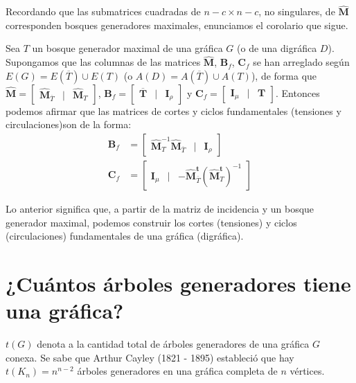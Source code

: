 Recordando que las submatrices cuadradas de $n-c \times n-c$, no singulares, de $\mathbf{\widehat{M}}$ corresponden bosques generadores maximales, enunciamos el corolario que sigue.

\begin{cor}
Sea $T$ un bosque generador maximal de una gráfica $G$ (o de una digráfica $D$). Supongamos que las columnas de las matrices  $\mathbf{\widehat{M}}$, $\mathbf{B}_{f}$, $\mathbf{C}_{f}$ se han arreglado según $E(G) = E(\overline{T}) \cup E(T)$ (o $A(D) = A(\overline{T}) \cup A(T)$), de forma que $\mathbf{\widehat{M}} = \begin{bmatrix} \mathbf{\widehat{M}}_{\overline{T}} & |& \mathbf{\widehat{M}}_{T} \end{bmatrix}$, $\mathbf{B}_{f} = \begin{bmatrix} \mathbf{\overline{T}} & |& \mathbf{I}_{\rho} \end{bmatrix}$ y $\mathbf{C}_{f} = \begin{bmatrix} \mathbf{I}_{\mu} & |& \mathbf{T} \end{bmatrix}$. Entonces podemos afirmar que las matrices de cortes y ciclos fundamentales (tensiones y circulaciones)son de la forma:
\begin{align*}
    \mathbf{B}_{f} &= \begin{bmatrix} \mathbf{\widehat{M}}_{T}^{-1}\mathbf{\widehat{M}}_{\overline{T}} & |& \mathbf{I}_{\rho} \end{bmatrix} \\
    \mathbf{C}_{f} &= \begin{bmatrix} \mathbf{I}_{\mu} & |& -\mathbf{\widehat{M}}_{\overline{T}}^{\mathbf{t}}(\mathbf{\widehat{M}}_{T}^{\mathbf{t}})^{-1}  \end{bmatrix}
\end{align*}
\end{cor}

Lo anterior significa que, a partir de la matriz de incidencia y un bosque generador maximal, podemos construir los cortes (tensiones) y ciclos (circulaciones) fundamentales de una gráfica (digráfica).

\section{¿Cuántos árboles generadores tiene una gráfica?}

$t(G)$ denota a la cantidad total de árboles generadores de una gráfica $G$ conexa. Se sabe que Arthur Cayley (1821 - 1895) estableció que hay $t(K_{n}) = n^{n-2}$ árboles generadores en una gráfica completa de $n$ vértices.

